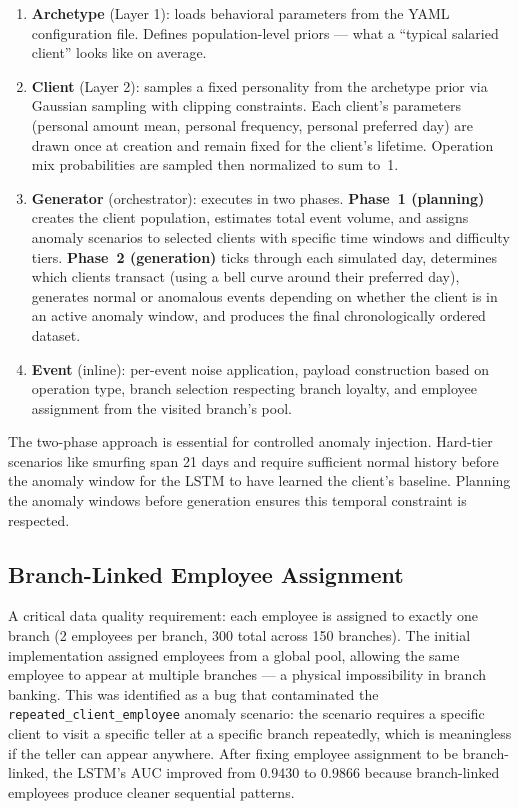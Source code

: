 \begin{enumerate}[leftmargin=2cm]
    \item \textbf{Archetype} (Layer 1): loads behavioral parameters from the
          YAML configuration file. Defines population-level priors --- what a
          ``typical salaried client'' looks like on average.

    \item \textbf{Client} (Layer 2): samples a fixed personality from the
          archetype prior via Gaussian sampling with clipping constraints.
          Each client's parameters (personal amount mean, personal frequency,
          personal preferred day) are drawn once at creation and remain fixed
          for the client's lifetime. Operation mix probabilities are sampled
          then normalized to sum to~1.

    \item \textbf{Generator} (orchestrator): executes in two phases.
          \textbf{Phase~1 (planning)} creates the client population, estimates
          total event volume, and assigns anomaly scenarios to selected clients
          with specific time windows and difficulty tiers.
          \textbf{Phase~2 (generation)} ticks through each simulated day,
          determines which clients transact (using a bell curve around their
          preferred day), generates normal or anomalous events depending on
          whether the client is in an active anomaly window, and produces the
          final chronologically ordered dataset.

    \item \textbf{Event} (inline): per-event noise application, payload
          construction based on operation type, branch selection respecting
          branch loyalty, and employee assignment from the visited branch's
          pool.
\end{enumerate}

The two-phase approach is essential for controlled anomaly injection. Hard-tier
scenarios like smurfing span 21 days and require sufficient normal history before
the anomaly window for the LSTM to have learned the client's baseline. Planning
the anomaly windows before generation ensures this temporal constraint is
respected.

\subsection{Branch-Linked Employee Assignment}

A critical data quality requirement: each employee is assigned to exactly one
branch (2 employees per branch, 300 total across 150 branches). The initial
implementation assigned employees from a global pool, allowing the same employee
to appear at multiple branches --- a physical impossibility in branch banking.
This was identified as a bug that contaminated the
\texttt{repeated\_client\_employee} anomaly scenario: the scenario requires a
specific client to visit a specific teller at a specific branch repeatedly, which
is meaningless if the teller can appear anywhere. After fixing employee assignment
to be branch-linked, the LSTM's AUC improved from 0.9430 to 0.9866 because
branch-linked employees produce cleaner sequential patterns.

